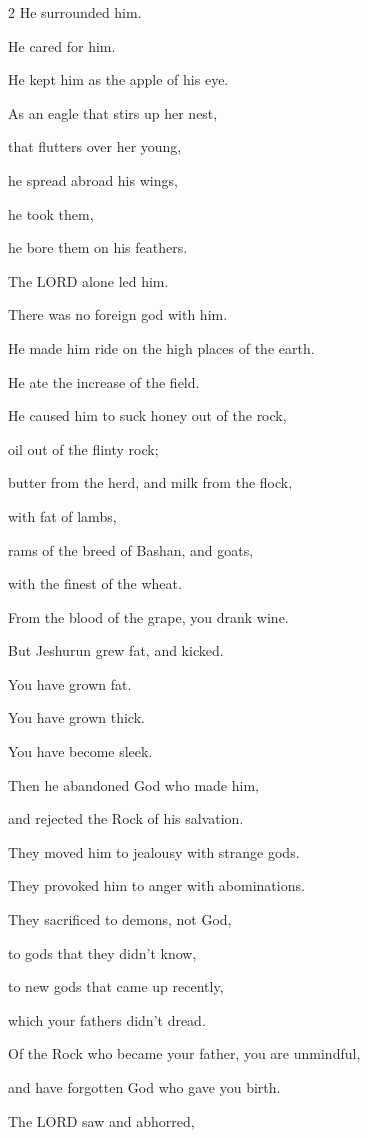 \begin{multicols}{2}
He surrounded him.

He cared for him.

He kept him as the apple of his eye.

\myverse{}As an eagle that stirs up her nest,

that flutters over her young,

he spread abroad his wings,

he took them,

he bore them on his feathers.

\myverse{}The LORD alone led him.

There was no foreign god with him.

\myverse{}He made him ride on the high places of the earth.

He ate the increase of the field.

He caused him to suck honey out of the rock,

oil out of the flinty rock;

\myverse{}butter from the herd, and milk from the flock,

with fat of lambs,

rams of the breed of Bashan, and goats,

with the finest of the wheat.

From the blood of the grape, you drank wine.

\myverse{}But Jeshurun grew fat, and kicked.

You have grown fat.

You have grown thick.

You have become sleek.

Then he abandoned God who made him,

and rejected the Rock of his salvation.

\myverse{}They moved him to jealousy with strange gods.

They provoked him to anger with abominations.

\myverse{}They sacrificed to demons, not God,

to gods that they didn’t know,

to new gods that came up recently,

which your fathers didn’t dread.

\myverse{}Of the Rock who became your father, you are unmindful,

and have forgotten God who gave you birth.

\myverse{}The LORD saw and abhorred,


\end{multicols}
